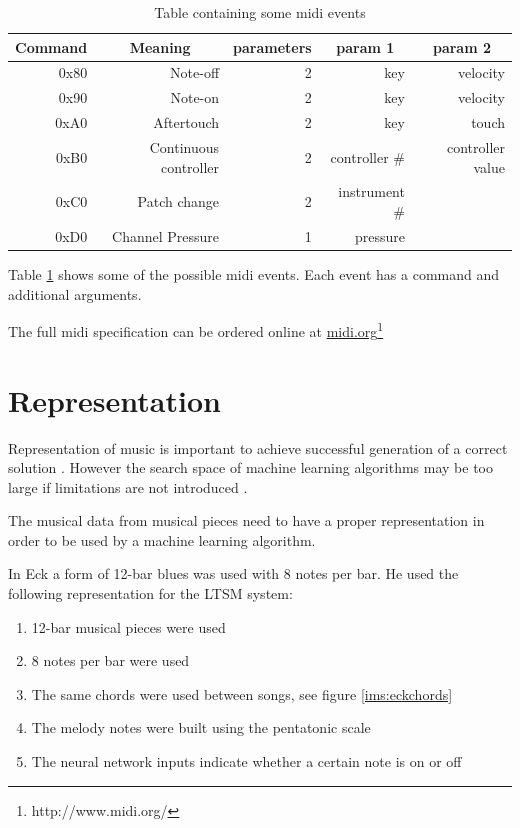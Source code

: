 \begin{table}[htbp]
  \centering
  \caption{Table containing some midi events}
    \begin{tabular}{rrrrr}
    \toprule
    \multicolumn{1}{c}{\textbf{Command}} & \multicolumn{1}{c}{\textbf{Meaning}} & \multicolumn{1}{c}{\textbf{parameters}} & \multicolumn{1}{c}{\textbf{param 1}} & \multicolumn{1}{c}{\textbf{param 2}} \\
    \midrule
    0x80  & Note-off & 2     & key   & velocity \\
    0x90  & Note-on & 2     & key   & velocity \\
    0xA0  & Aftertouch & 2     & key   & touch \\
    0xB0  & Continuous controller & 2     & controller \# & controller value \\
    0xC0  & Patch change & 2     & instrument \# &  \\
    0xD0  & Channel Pressure & 1     & pressure &  \\
    \bottomrule
    \end{tabular}%
  \label{tab:midievents}%
\end{table}%

Table \ref{tab:midievents} shows some of the possible midi events. Each event has a command and additional arguments.

The full midi specification can be ordered online at \href{http://www.midi.org/}{midi.org}\footnote{http://www.midi.org/}


\section{Representation}
Representation of music is important to achieve successful generation of a correct solution \cite{gibson1991neurogen}. However the search space of machine learning algorithms may be too large if limitations are not introduced \cite{Jacob1995}. 

The musical data from musical pieces need to have a proper representation in order to be used by a machine learning algorithm.

In \cite{Eck2002} Eck a form of 12-bar blues was used with 8 notes per bar. 
He used the following representation for the \acs{LTSM} system:
\begin{enumerate}
\item 12-bar musical pieces were used
\item 8 notes per bar were used
\item The same chords were used between songs, see figure \ref{ims:eckchords}
\item The melody notes were built using the pentatonic scale
\item The neural network inputs indicate whether a certain note is on or off
\end{enumerate}

